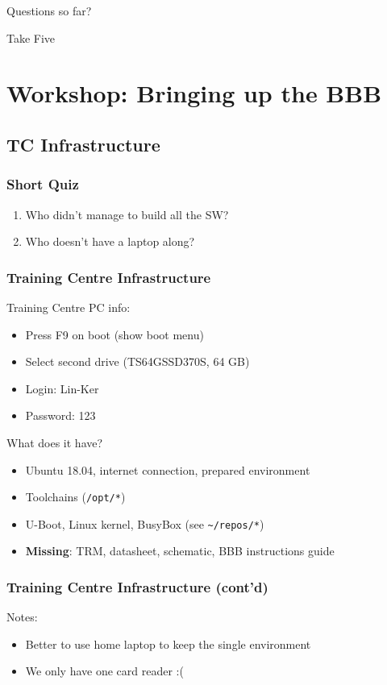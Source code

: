 \documentclass[aspectratio=169]{beamer}
\begin{document}
\begin{frame}[standout]
  Questions so far?
\end{frame}

\begin{frame}[standout]
  Take Five
\end{frame}

\section{Workshop: Bringing up the BBB}

\subsection{TC Infrastructure}

\begin{frame}
  \frametitle{Short Quiz}
  \begin{enumerate}
    \item Who didn't manage to build all the SW?
    \item Who doesn't have a laptop along?
  \end{enumerate}
\end{frame}

\begin{frame}
  \frametitle{Training Centre Infrastructure}

  Training Centre PC info:
  \begin{itemize}
    \item Press F9 on boot (show boot menu)
    \item Select second drive (TS64GSSD370S, 64 GB)
    \item Login: Lin-Ker
    \item Password: 123
  \end{itemize}

  What does it have?
  \begin{itemize}
    \item Ubuntu 18.04, internet connection, prepared environment
    \item Toolchains (\texttt{/opt/*})
    \item U-Boot, Linux kernel, BusyBox (see \texttt{\textasciitilde/repos/*})
    \item \textbf{Missing}: TRM, datasheet, schematic, BBB instructions guide
  \end{itemize}
\end{frame}

\begin{frame}
  \frametitle{Training Centre Infrastructure (cont'd)}
  Notes:
  \begin{itemize}
    \item Better to use home laptop to keep the single environment
    \item We only have one card reader :(
  \end{itemize}
\end{frame}
\end{document}
